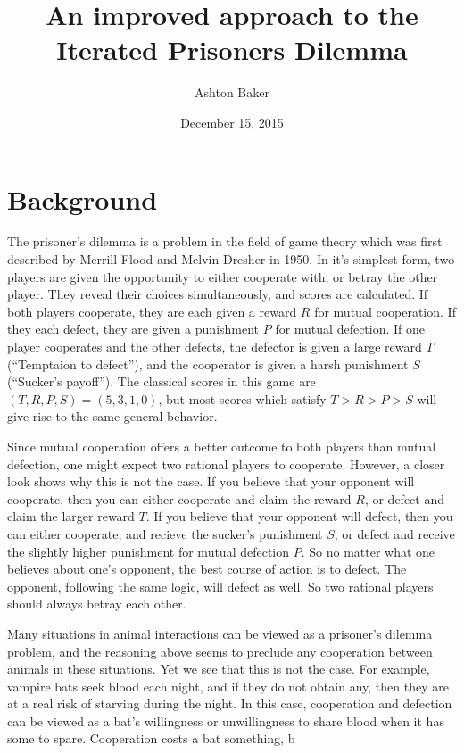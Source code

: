 \documentclass{article}
\title{An improved approach to the Iterated Prisoners Dilemma}
\date{December 15, 2015}
\author{Ashton Baker}
\begin{document}
\maketitle

\section{Background}
The prisoner's dilemma is a problem in the field of game theory which was first described by Merrill Flood and Melvin Dresher in 1950. In it's simplest form, two players are given the opportunity to either cooperate with, or betray the other player. They reveal their choices simultaneously, and scores are calculated. If both players cooperate, they are each given a reward \(R\) for mutual cooperation. If they each defect, they are given a punishment \(P\) for mutual defection. If one player cooperates and the other defects, the defector is given a large reward \(T\) (``Temptaion to defect''), and the cooperator is given a harsh punishment \(S\) (``Sucker's payoff''). The classical scores in this game are \((T, R, P, S) = (5, 3, 1, 0)\), but most scores which satisfy \(T > R > P > S\) will give rise to the same general behavior.

Since mutual cooperation offers a better outcome to both players than mutual defection, one might expect two rational players to cooperate. However, a closer look shows why this is not the case. If you believe that your opponent will cooperate, then you can either cooperate and claim the reward \(R\), or defect and claim the larger reward \(T\). If you believe that your opponent will defect, then you can either cooperate, and recieve the sucker's punishment \(S\), or defect and receive the slightly higher punishment for mutual defection \(P\). So no matter what one believes about one's opponent, the best course of action is to defect. The opponent, following the same logic, will defect as well. So two rational players should always betray each other.

Many situations in animal interactions can be viewed as a prisoner's dilemma problem, and the reasoning above seems to preclude any cooperation between animals in these situations. Yet we see that this is not the case. For example, vampire bats seek blood each night, and if they do not obtain any, then they are at a real risk of starving during the night. In this case, cooperation and defection can be viewed as a bat's willingness or unwillingness to share blood when it has some to spare. Cooperation costs a bat something, b
\end{document}
